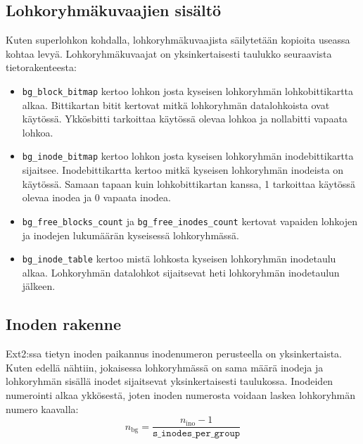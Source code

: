 \subsection{Lohkoryhmäkuvaajien sisältö}
Kuten superlohkon kohdalla, lohkoryhmäkuvaajista säilytetään kopioita useassa kohtaa levyä.
Lohkoryhmäkuvaajat on yksinkertaisesti taulukko seuraavista tietorakenteesta:
\begin{itemize}
    \item \texttt{bg\_block\_bitmap} kertoo lohkon josta kyseisen lohkoryhmän lohkobittikartta alkaa.
          Bittikartan bitit kertovat mitkä lohkoryhmän datalohkoista ovat käytössä.
          Ykkösbitti tarkoittaa käytössä olevaa lohkoa ja nollabitti vapaata lohkoa.
    \item \texttt{bg\_inode\_bitmap} kertoo lohkon josta kyseisen lohkoryhmän inodebittikartta sijaitsee.
          Inodebittikartta kertoo mitkä kyseisen lohkoryhmän inodeista on käytössä.
          Samaan tapaan kuin lohkobittikartan kanssa, 1 tarkoittaa käytössä olevaa inodea ja 0 vapaata inodea.
    \item \texttt{bg\_free\_blocks\_count} ja \texttt{bg\_free\_inodes\_count} kertovat vapaiden lohkojen ja inodejen lukumäärän kyseisessä lohkoryhmässä.
    \item \texttt{bg\_inode\_table} kertoo mistä lohkosta kyseisen lohkoryhmän inodetaulu alkaa. Lohkoryhmän datalohkot sijaitsevat heti lohkoryhmän inodetaulun jälkeen.
\end{itemize}

\subsection{Inoden rakenne}

Ext2:ssa tietyn inoden paikannus inodenumeron perusteella on yksinkertaista.
Kuten edellä nähtiin, jokaisessa lohkoryhmässä on sama määrä inodeja ja lohkoryhmän sisällä inodet sijaitsevat yksinkertaisesti taulukossa.
Inodeiden numerointi alkaa ykkösestä, joten inoden numerosta voidaan laskea lohkoryhmän numero kaavalla:
$$ n_\text{bg} = \frac{n_\text{ino} - 1}{\texttt{s\_inodes\_per\_group}} $$

